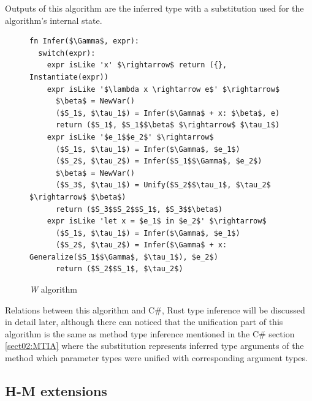 Outputs of this algorithm are the inferred type with a substitution used for the algorithm's internal state. 
\begin{figure}
\begin{lstlisting}[style=myAlgo, mathescape=true]
fn Infer($\Gamma$, expr):
  switch(expr):
    expr isLike 'x' $\rightarrow$ return ({}, Instantiate(expr))
    expr isLike '$\lambda x \rightarrow e$' $\rightarrow$
      $\beta$ = NewVar()
      ($S_1$, $\tau_1$) = Infer($\Gamma$ + x: $\beta$, e)
      return ($S_1$, $S_1$$\beta$ $\rightarrow$ $\tau_1$)
    expr isLike '$e_1$$e_2$' $\rightarrow$
      ($S_1$, $\tau_1$) = Infer($\Gamma$, $e_1$)
      ($S_2$, $\tau_2$) = Infer($S_1$$\Gamma$, $e_2$)
      $\beta$ = NewVar()
      ($S_3$, $\tau_1$) = Unify($S_2$$\tau_1$, $\tau_2$ $\rightarrow$ $\beta$)
      return ($S_3$$S_2$$S_1$, $S_3$$\beta$)
    expr isLike 'let x = $e_1$ in $e_2$' $\rightarrow$
      ($S_1$, $\tau_1$) = Infer($\Gamma$, $e_1$)
      ($S_2$, $\tau_2$) = Infer($\Gamma$ + x: Generalize($S_1$$\Gamma$, $\tau_1$), $e_2$)
      return ($S_2$$S_1$, $\tau_2$)
\end{lstlisting}
\caption{\textit{W} algorithm}
\label{img16:w}
\end{figure}
\par
Relations between this algorithm and C\#, Rust type inference will be discussed in detail later, although there can noticed that the unification part of this algorithm is the same as method type inference mentioned in the C\# section \ref{sect02:MTIA} where the substitution represents inferred type arguments of the method which parameter types were unified with corresponding argument types.

\newpage

\subsection{H-M extensions}

